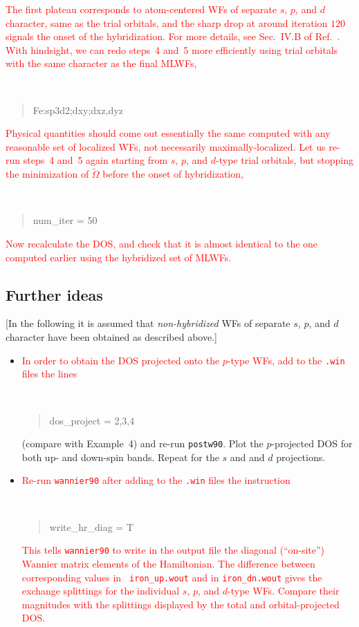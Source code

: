 \documentclass[a4paper,11pt,twoside]{article}
\def\tent#1{\textcolor{red}{#1}}     %
\begin{document}
\tent{The first plateau corresponds to atom-centered WFs of separate
  $s$, $p$, and $d$ character, same as the trial orbitals, and the
  sharp drop at around iteration $120$ signals the onset of the
  hybridization. For more details, see Sec.~IV.B of
  Ref.~\cite{wang-prb06}. With hindsight, we can redo steps~4 and~5
  more efficiently using trial orbitals with the same character as the
  final MLWFs,} {\tt
\begin{quote}
Fe:sp3d2;dxy;dxz,dyz
\end{quote}
}


\tent{Physical quantities should come out essentially the same
  computed with any reasonable set of localized WFs, not necessarily
  maximally-localized.  Let us re-run steps~4 and~5 again starting
  from $s$, $p$, and $d$-type trial orbitals, but stopping the
  minimization of $\widetilde{\Omega}$ before the onset of
  hybridization,} {\tt
\begin{quote}
num\_iter = 50
\end{quote}
}

\tent{Now recalculate the DOS, and check that it is almost identical to
  the one computed earlier using the hybridized set of MLWFs.}


\subsection*{Further ideas}

[In the following it is assumed that {\it non-hybridized} WFs of
separate $s$, $p$, and $d$ character have been obtained as described
above.]

\begin{itemize}

\item \tent{In order to obtain the DOS projected onto the $p$-type
    WFs, add to the {\tt .win} files the lines} {\tt
\begin{quote}
dos\_project = 2,3,4
\end{quote}
}

(compare with Example~4)
and re-run {\tt postw90}. Plot the $p$-projected DOS for both up- and
down-spin bands. Repeat for the $s$ and and $d$ projections.

\item \tent{Re-run {\tt wannier90} after adding to the {\tt .win}
    files the instruction} {\tt
\begin{quote}
write\_hr\_diag = T
\end{quote}
}

\tent{This tells {\tt wannier90} to write in the output file the
  diagonal (``on-site'') Wannier matrix elements of the
  Hamiltonian. The difference between corresponding values in {\tt
    iron\_up.wout} and in {\tt iron\_dn.wout} gives the exchange
  splittings for the individual $s$, $p$, and $d$-type WFs. Compare
  their magnitudes with the splittings displayed by the total and
  orbital-projected DOS.}

\end{itemize}
\end{document}

